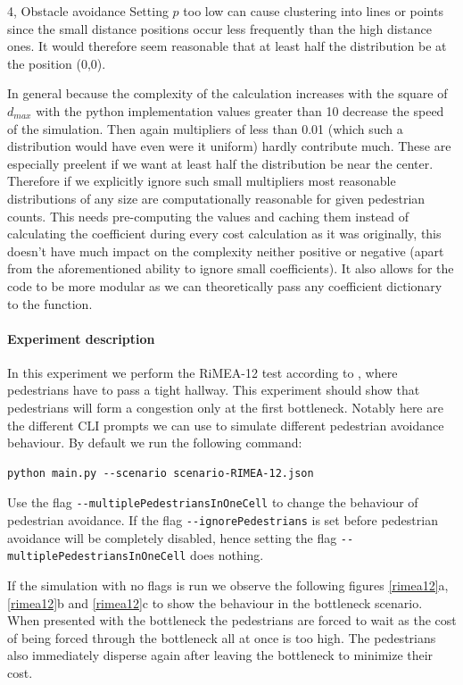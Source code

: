 \begin{task}{4, Obstacle avoidance}
Setting $p$ too low can cause clustering into lines or points since the small distance positions occur less frequently than the high distance ones. It would therefore seem reasonable that at least half the distribution be at the position (0,0).

In general because the complexity of the calculation increases with the square of $d_{max}$ with the python implementation values greater than 10 decrease the speed of the simulation. Then again multipliers of less than 0.01 (which such a distribution would have even were it uniform) hardly contribute much. These are especially preelent if we want at least half the distribution be near the center. Therefore if we explicitly ignore such small multipliers most reasonable distributions of any size are computationally reasonable for given pedestrian counts. This needs pre-computing the values and caching them instead of calculating the coefficient during every cost calculation as it was originally, this doesn't have much impact on the complexity neither positive or negative (apart from the aforementioned ability to ignore small coefficients). It also allows for the code to be more modular as we can theoretically pass any coefficient dictionary to the function.

\paragraph{Experiment description}
In this experiment we perform the RiMEA-12 test according to \cite{rimea2016}, where pedestrians have to pass a tight hallway. This experiment should show that pedestrians will form a congestion only at the first bottleneck. Notably here are the different CLI prompts we can use to simulate different pedestrian avoidance behaviour. By default we run the following command:
\begin{verbatim}
python main.py --scenario scenario-RIMEA-12.json
\end{verbatim}
Use the flag \verb+--multiplePedestriansInOneCell+ to change the behaviour of pedestrian avoidance. If the flag \verb+--ignorePedestrians+ is set before pedestrian avoidance will be completely disabled, hence setting the flag \verb+--multiplePedestriansInOneCell+ does nothing. 

If the simulation with no flags is run we observe the following figures \ref{rimea12}a, \ref{rimea12}b and \ref{rimea12}c to show the behaviour in the bottleneck scenario. When presented with the bottleneck the pedestrians are forced to wait as the cost of being forced through the bottleneck all at once is too high. The pedestrians also immediately disperse again after leaving the bottleneck to minimize their cost.


\end{task}

